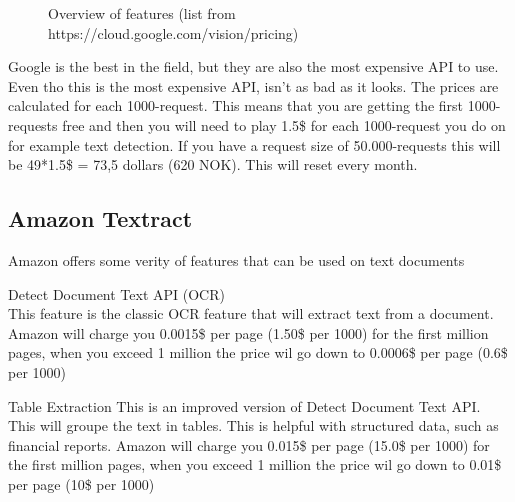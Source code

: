 \begin{figure}[h]
    \caption{Overview of features (list from https://cloud.google.com/vision/pricing)}
    \label{fig:Prices}
\end{figure}

Google is the best in the field, but they are also the most expensive API to use.
Even tho this is the most expensive API, isn't as bad as it looks.
The prices are calculated for each 1000-request.
This means that you are getting the first 1000-requests free and then you will need to play 1.5\$ for each 1000-request you do on for example text detection.
If you have a request size of 50.000-requests this will be 49*1.5\$ = 73,5 dollars (620 NOK).
This will reset every month.

\subsection{Amazon Textract}\label{subsec:API_Amazon}

Amazon offers some verity of features that can be used on text documents

Detect Document Text API (OCR)\\
This feature is the classic OCR feature that will extract text from a document.\\
Amazon will charge you 0.0015\$ per page (1.50\$ per 1000) for the first million pages, when you exceed 1 million the price wil go down to
0.0006\$ per page (0.6\$ per 1000)

Table Extraction
This is an improved version of Detect Document Text API. This will groupe the text in tables.
This is helpful with structured data, such as financial reports.
Amazon will charge you 0.015\$ per page (15.0\$ per 1000) for the first million pages, when you exceed 1 million the price wil go down to
0.01\$ per page (10\$ per 1000)

